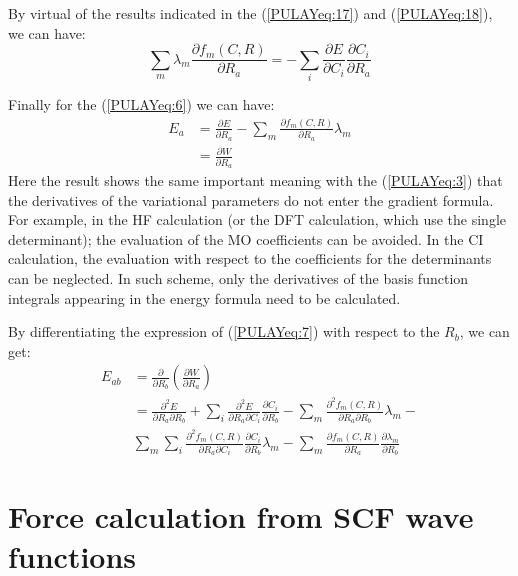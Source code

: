 By virtual of the results indicated in the (\ref{PULAYeq:17}) and
(\ref{PULAYeq:18}), we can have:
\begin{equation}\label{}
  \sum_{m}\lambda_{m}\frac{\partial f_{m}(C,R)}{\partial R_{a}} = -
  \sum_{i}\frac{\partial E}{\partial C_{i}}\frac{\partial
    C_{i}}{\partial R_{a}}
\end{equation}

Finally for the (\ref{PULAYeq:6}) we can have:
\begin{align}\label{PULAYeq:7}
  E_{a} &= \frac{\partial E}{\partial R_{a}} - \sum_{m}\frac{\partial
    f_{m}(C,R)}{\partial
    R_{a}}\lambda_{m} \nonumber \\
  &= \frac{\partial W}{\partial R_{a}}
\end{align}
Here the result shows the same important meaning with the
(\ref{PULAYeq:3}) that the derivatives of the variational parameters
do not enter the gradient formula. For example, in the HF calculation
(or the DFT calculation, which use the single determinant); the
evaluation of the MO coefficients can be avoided.  In the CI
calculation, the evaluation with respect to the coefficients for the
determinants can be neglected. In such scheme, only the derivatives of
the basis function integrals appearing in the energy formula need to
be calculated.

By differentiating the expression of (\ref{PULAYeq:7}) with respect to
the $R_{b}$, we can get:
\begin{align}\label{}
  E_{ab} &=\frac{\partial}{\partial R_{b}}\left(\frac{\partial
      W}{\partial
      R_{a}}\right) \nonumber \\
  &=\frac{\partial^{2} E}{\partial R_{a}\partial R_{b}} +
  \sum_{i}\frac{\partial^{2} E}{\partial R_{a}\partial
    C_{i}}\frac{\partial C_{i}}{\partial R_{b}} -
  \sum_{m}\frac{\partial^{2} f_{m}(C,R)}
  {\partial R_{a}\partial R_{b}}\lambda_{m} - \nonumber \\
  &\sum_{m}\sum_{i}\frac{\partial^{2} f_{m}(C,R)}{\partial
    R_{a}\partial C_{i}}\frac{\partial C_{i}}{\partial
    R_{b}}\lambda_{m} - \sum_{m}\frac{\partial f_{m}(C,R)}{\partial
    R_{a}}\frac{\partial \lambda_{m}}{\partial R_{b}}
\end{align}

\section{Force calculation from SCF wave functions}
%
%
